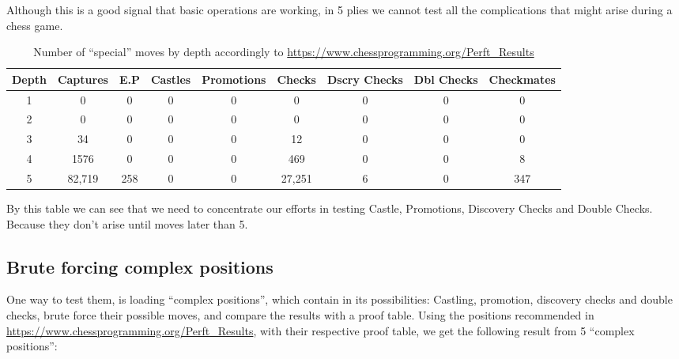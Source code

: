 \documentclass[10pt]{article}
\begin{document}
Although this is a good signal that basic operations are working, in 5 plies we
cannot test all the complications that might arise during a chess game.

\begin{table}[H]
\center
\begin{tabular}{|c|c|c|c|c|c|c|c|c|}
\hline
\textbf{Depth}   & \textbf{Captures} & \textbf{E.P} &
\textbf{Castles} & \textbf{Promotions} & \textbf{Checks} & \textbf{Dscry
Checks} & \textbf{Dbl Checks} & \textbf{Checkmates} \\
\hline
   1  & 0 & 0 & 0 & 0 & 0 & 0 & 0 & 0 \\
\hline
   2  & 0 & 0 & 0 & 0 & 0 & 0 & 0 & 0 \\
\hline
   3  & 34 & 0 & 0 & 0 & 12 & 0 & 0 & 0 \\
\hline
   4  & 1576 & 0 & 0 & 0 & 469 & 0 & 0 & 8 \\
\hline
5  & 82,719 & 258 & 0 & 0 & 27,251 & 6 & 0 & 347 \\
\hline
\end{tabular}
\caption{Number of ``special'' moves by depth accordingly to
\url{https://www.chessprogramming.org/Perft_Results} }
\end{table}

By this table we can see that we need to concentrate our efforts in testing
Castle, Promotions, Discovery Checks and Double Checks. Because they don't arise
until moves later than 5.

\subsection{Brute forcing complex positions}


One way to test them, is loading ``complex positions'', which contain in its
possibilities: Castling, promotion, discovery checks and double checks, brute
force their
possible moves, and compare the results with a proof table. Using the
positions recommended in \url{https://www.chessprogramming.org/Perft_Results},
with their respective proof table,
we get the following result from 5 ``complex positions'':
\end{document}

